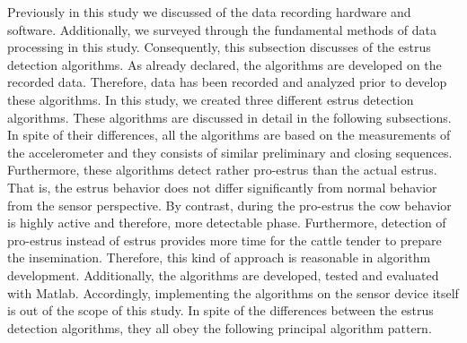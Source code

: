 \documentclass[english,12pt,a4paper,pdftex,elec,utf8]{aaltothesis}
\begin{document}
Previously in this study we discussed of the data recording hardware and software. Additionally, we surveyed through the fundamental methods of data processing in this study. Consequently, this subsection discusses of the estrus detection algorithms. As already declared, the algorithms are developed on the recorded data. Therefore, data has been recorded and analyzed prior to develop these algorithms. In this study, we created three different estrus detection algorithms. These algorithms are discussed in detail in the following subsections. In spite of their differences, all the algorithms are based on the measurements of the accelerometer and they consists of similar preliminary and closing sequences. Furthermore, these algorithms detect rather pro-estrus than the actual estrus. That is, the estrus behavior does not differ significantly from normal behavior from the sensor perspective. By contrast, during the pro-estrus the cow behavior is highly active and therefore, more detectable phase. Furthermore, detection of pro-estrus instead of estrus provides more time for the cattle tender to prepare the insemination. Therefore, this kind of approach is reasonable in algorithm development. Additionally, the algorithms are developed, tested and evaluated with Matlab. Accordingly, implementing the algorithms on the sensor device itself is out of the scope of this study. In spite of the differences between the estrus detection algorithms, they all obey the following principal algorithm pattern.
  
\end{document}
